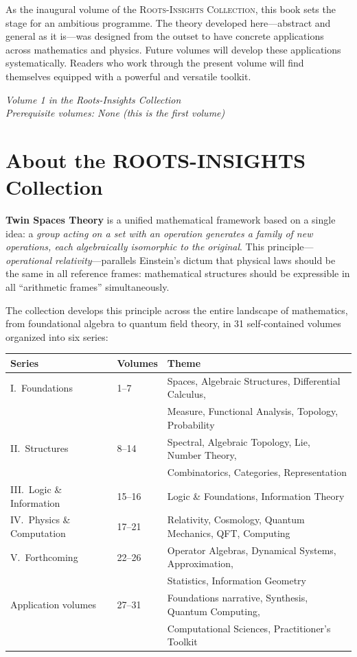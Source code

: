 \documentclass[11pt,a4paper,openany]{book}
\theoremstyle{plain}
\theoremstyle{definition}
\begin{document}
As the inaugural volume of the \textsc{Roots-Insights Collection}, this book sets the stage for an ambitious programme. The theory developed here---abstract and general as it is---was designed from the outset to have concrete applications across mathematics and physics. Future volumes will develop these applications systematically. Readers who work through the present volume will find themselves equipped with a powerful and versatile toolkit.

\medskip
\noindent\textit{Volume 1 in the Roots-Insights Collection}\\
\textit{Prerequisite volumes: None (this is the first volume)}

\cleardoublepage

\chapter*{About the ROOTS-INSIGHTS Collection}

\textbf{Twin Spaces Theory} is a unified mathematical framework based on a single idea: a \emph{group acting on a set with an operation generates a family of new operations, each algebraically isomorphic to the original}. This principle---\emph{operational relativity}---parallels Einstein's dictum that physical laws should be the same in all reference frames: mathematical structures should be expressible in all ``arithmetic frames'' simultaneously.

The collection develops this principle across the entire landscape of mathematics, from foundational algebra to quantum field theory, in 31 self-contained volumes organized into six series:

\begin{center}
\small
\begin{tabular}{lll}
\toprule
\textbf{Series} & \textbf{Volumes} & \textbf{Theme} \\
\midrule
I.\ Foundations & 1--7 & Spaces, Algebraic Structures, Differential Calculus,\\
& & Measure, Functional Analysis, Topology, Probability \\
II.\ Structures & 8--14 & Spectral, Algebraic Topology, Lie, Number Theory, \\
& & Combinatorics, Categories, Representation \\
III.\ Logic \& Information & 15--16 & Logic \& Foundations, Information Theory \\
IV.\ Physics \& Computation & 17--21 & Relativity, Cosmology, Quantum Mechanics, QFT, Computing \\
V.\ Forthcoming & 22--26 & Operator Algebras, Dynamical Systems, Approximation,\\
& & Statistics, Information Geometry \\
Application volumes & 27--31 & Foundations narrative, Synthesis, Quantum Computing,\\
& & Computational Sciences, Practitioner's Toolkit \\
\bottomrule
\end{tabular}
\end{center}
\end{document}

